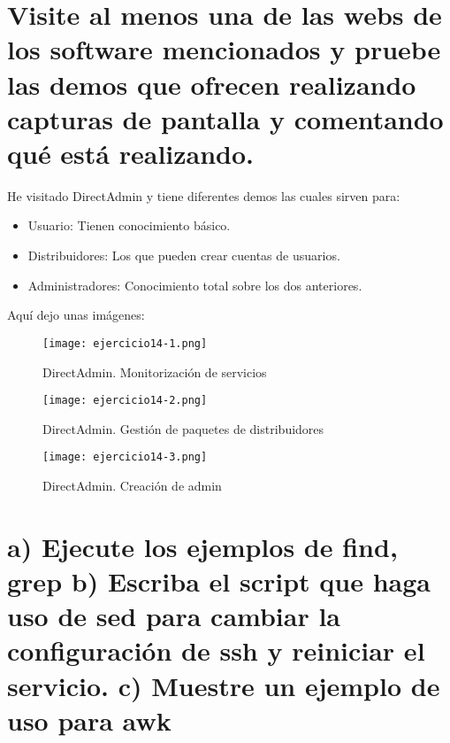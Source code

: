 	
	
	\section{Visite al menos una de las webs de los software mencionados y pruebe las demos que ofrecen realizando capturas de pantalla y comentando qué está realizando.}
	
	He visitado DirectAdmin y tiene diferentes demos las cuales sirven para:
	
	\begin{itemize}
		\item Usuario: Tienen conocimiento básico.
		\item Distribuidores: Los que pueden crear cuentas de usuarios.
		\item Administradores: Conocimiento total sobre los dos anteriores.
	\end{itemize}
	
	Aquí dejo unas imágenes:
	
	\begin{figure}[H]	
		\centering
		\texttt{[image: ejercicio14-1.png]} 
		\label{figura99} 
		\caption{DirectAdmin. Monitorización de servicios}
	\end{figure}
	
	\begin{figure}[H]	
		\centering
		\texttt{[image: ejercicio14-2.png]} 
		\label{figura100} 
		\caption{DirectAdmin. Gestión de paquetes de distribuidores}
	\end{figure}
	
	\begin{figure}[H]	
		\centering
		\texttt{[image: ejercicio14-3.png]} 
		\label{figura101} 
		\caption{DirectAdmin. Creación de admin}
	\end{figure}


	
	\section{a) Ejecute los ejemplos de find, grep b) Escriba el script que haga uso de sed para cambiar la configuración de ssh y reiniciar el servicio. c) Muestre un ejemplo de uso para awk}
	

